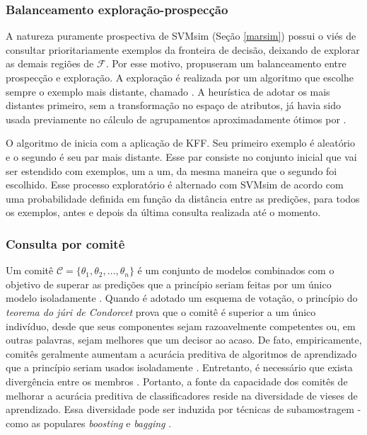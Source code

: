 \subsubsection{Balanceamento exploração-prospecção}
A natureza puramente prospectiva de SVMsim (Seção \ref{marsim}) possui o viés de consultar prioritariamente exemplos da fronteira de decisão, deixando de explorar as demais regiões de $\mathcal{F}$.
Por esse motivo,  propuseram um balanceamento 
entre prospecção e exploração.
A exploração é realizada por um algoritmo que escolhe sempre o exemplo mais distante, chamado .
A heurística de adotar os mais distantes primeiro, sem a transformação no espaço de atributos, já havia sido usada previamente no cálculo de agrupamentos aproximadamente ótimos por .

O algoritmo de  inicia com a aplicação de KFF.
Seu primeiro exemplo é aleatório e o segundo é seu par mais distante.
Esse par consiste no conjunto inicial que vai ser estendido com exemplos,
um a um, da mesma maneira que o segundo foi escolhido.
Esse processo exploratório é alternado com SVMsim de acordo com uma probabilidade definida em função da distância entre as predições, para todos os exemplos, antes e depois da última consulta realizada até o momento.

\subsubsection{Consulta por comitê}\label{qbc}
Um comitê $\mathcal{C} = \{\theta_1,\theta_2, \ldots, \theta_n\}$ é um conjunto de modelos combinados com o objetivo de superar as predições que a princípio seriam feitas por um único modelo isoladamente \cite{dietterich2000ensemble}.
Quando é adotado um esquema de votação, o princípio do \textit{teorema do júri de Condorcet} \cite{valentini2002ensembles} prova que o comitê é superior a um único indivíduo, desde que seus componentes sejam razoavelmente competentes ou, em outras palavras, sejam melhores que um decisor ao acaso.
De fato, empiricamente, comitês geralmente aumentam a acurácia preditiva de algoritmos de aprendizado que a princípio seriam usados isoladamente \cite{bauer1999empirical}.
Entretanto, é necessário que exista divergência entre os membros \cite{hansen1990neural}.
Portanto, a fonte da capacidade dos comitês de melhorar a acurácia preditiva de classificadores reside na diversidade de vieses de aprendizado.
Essa diversidade pode ser induzida por técnicas de subamostragem - como as populares \textit{boosting} \cite{schapire1990strength} e \textit{bagging}
\cite{breiman1996bagging}.

